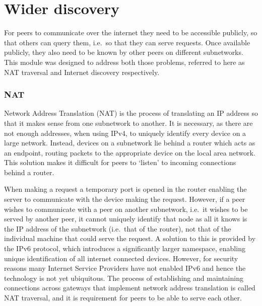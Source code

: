 \newpage


\section{Wider discovery}
\label{sec:widerdiscovery}

For peers to communicate over the internet they need to be accessible publicly, so that others can query them, i.e.\ so that they can serve requests. Once available publicly, they also need to be known by other peers on different subnetworks. This module was designed to address both those problems, referred to here as NAT traversal and Internet discovery respectively.

\subsubsection{NAT}

Network Address Translation (NAT) is the process of translating an IP address so that it makes sense from one subnetwork to another. It is necessary, as there are not enough addresses, when using IPv4, to uniquely identify every device on a large network. Instead, devices on a subnetwork lie behind a router which acts as an endpoint, routing packets to the appropriate device on the local area network. This solution makes it difficult for peers to `listen' to incoming connections behind a router.

When making a request a temporary port is opened in the router enabling the server to communicate with the device making the request. However, if a peer wishes to communicate with a peer on another subnetwork, i.e.\ it wishes to be served by another peer, it cannot uniquely identify that node as all it knows is the IP address of the subnetwork (i.e.\ that of the router), not that of the individual machine that could serve the request. A solution to this is provided by the IPv6 protocol, which introduces a significantly larger namespace, enabling unique identification of all internet connected devices. However, for security reasons many Internet Service Providers have not enabled IPv6 and hence the technology is not yet ubiquitous. The process of establishing and maintaining connections across gateways that implement network address translation is called NAT traversal, and it is requirement for peers to be able to serve each other.

